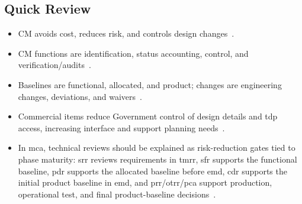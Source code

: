 \documentclass[../main.tex]{subfiles}
\begin{document}
\subsection{Quick Review}
\begin{itemize}
  \item CM avoids cost, reduces risk, and controls design changes~\autocite{edo-3-5-3-cm-tech-reviews-2025}.
  \item CM functions are identification, status accounting, control, and verification/audits~\autocite{edo-3-5-3-cm-tech-reviews-2025}.
  \item Baselines are functional, allocated, and product; changes are engineering changes, deviations, and waivers~\autocite{edo-3-5-3-cm-tech-reviews-2025}.
  \item Commercial items reduce Government control of design details and \ac{tdp} access, increasing interface and support planning needs~\autocite{edo-3-5-3-cm-tech-reviews-2025}.
  \item In \ac{mca}, technical reviews should be explained as risk-reduction gates tied to phase maturity: \ac{srr} reviews requirements in \ac{tmrr}, \ac{sfr} supports the functional baseline, \ac{pdr} supports the allocated baseline before \ac{emd}, \ac{cdr} supports the initial product baseline in \ac{emd}, and \ac{prr}/\ac{otrr}/\ac{pca} support production, operational test, and final product-baseline decisions~\autocite{DoDI5000-88,DoD-EngineeringDefenseSystemsGuidebook-2024,DAU-Technical-Baselines,DAU-System-Requirements-Review,DAU-System-Functional-Review}.
\end{itemize}

\end{document}
